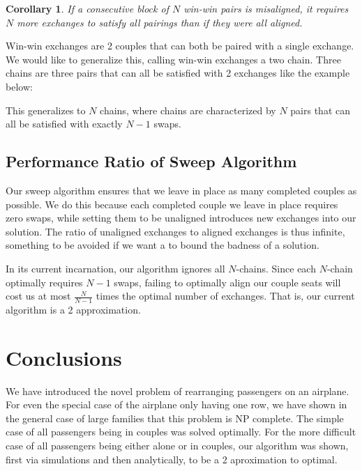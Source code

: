 \documentclass[a4paper]{article}
\newtheorem{cor}[lem]{Corollary}
\begin{document}
\begin{cor} \label{cor:winWinAsBlocks}
If a consecutive block of $N$ win-win pairs is misaligned, it requires $N$ more exchanges to satisfy all pairings than if they were all aligned.
\end{cor}

Win-win exchanges are 2 couples that can both be paired with a single exchange.  We would like to generalize this, calling win-win exchanges a two chain.  Three chains are three pairs that can all be satisfied with 2 exchanges like the example below:

\begin{figure}[H]
\centering
{}
\end{figure}

This generalizes to $N$ chains, where chains are characterized by $N$ pairs that can all be satisfied with exactly $N-1$ swaps.

\subsection{Performance Ratio of Sweep Algorithm}

Our sweep algorithm ensures that we leave in place as many completed couples as possible. We do this because each completed couple we leave in place requires zero swaps, while setting them to be unaligned introduces new exchanges into our solution.  The ratio of unaligned exchanges to aligned exchanges is thus infinite, something to be avoided if we want a to bound the badness of a solution.

In its current incarnation, our algorithm ignores all $N$-chains.  Since each $N$-chain optimally requires $N-1$ swaps, failing to optimally align our couple seats will cost us at most $\frac{N}{N-1}$ times the optimal number of exchanges.  That is, our current algorithm is a 2 approximation.

\section{Conclusions}

We have introduced the novel problem of rearranging passengers on an airplane.  For even the special case of the airplane only having one row, we have shown in the general case of large families that this problem is NP complete.  The simple case of all passengers being in couples was solved optimally. For the more difficult case of all passengers being either alone or in couples, our algorithm was shown, first via simulations and then analytically, to be a 2 aproximation to optimal.
\end{document}
